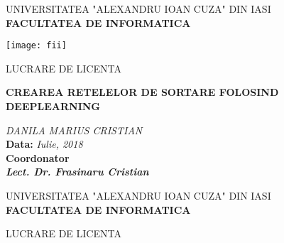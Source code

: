\documentclass[12pt]{article}
\newcommand\blankpage{%
    \null
    \thispagestyle{empty}%
    \addtocounter{page}{-1}%
    \newpage}
\begin{document}
\begin{titlepage}

\begin{center}

UNIVERSITATEA "ALEXANDRU IOAN CUZA" DIN IASI
\\
\textbf{FACULTATEA DE INFORMATICA}
\\
\begin{center}
\texttt{[image: fii]}
\end{center}

\end{center}

   \vspace{20mm}

\begin{center}
    \end{center}
   \vspace{10mm}
\begin{center}
	\Large{LUCRARE DE LICENTA}\\
	
	\vspace{10mm}
	
	\large \textbf{CREAREA RETELELOR DE SORTARE FOLOSIND DEEPLEARNING}\\
	\vspace{5mm}
		
	\vspace{5mm}
	\large\textit {DANILA MARIUS CRISTIAN}
	\\
	\vspace{20mm}
	\textbf{Data: }\textit{Iulie, 2018}\\
	\vspace{10mm}
	\textbf{Coordonator}\\
	\textbf{\textit{Lect. Dr. Frasinaru Cristian}}
	\vspace{30mm}
\end{center}


\afterpage{\blankpage}
\begin{center}

UNIVERSITATEA "ALEXANDRU IOAN CUZA" DIN IASI
\\
\textbf{FACULTATEA DE INFORMATICA}
\\
\begin{center}
\end{center}

\end{center}

   \vspace{20mm}

\begin{center}
    \end{center}
   \vspace{10mm}
\begin{center}
	\Large{LUCRARE DE LICENTA}\\
	

\end{center}
\end{titlepage}
\end{document}
